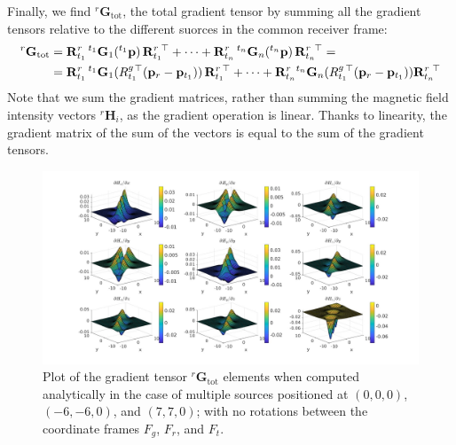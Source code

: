 Finally, we find ${}^r \mathbf{G}_{\text{tot}}$, the total gradient tensor by summing all the gradient tensors
relative to the different suorces in the common receiver frame:
\begin{align}
{}^r \mathbf{G}_{\text{tot}} &= 
\mathbf{R}^r_{t_1}  \, {}^{t_1}\mathbf{G}_1({}^{t_1} \mathbf{p}) \, {\mathbf{R}^r_{t_1}}\mkern-2mu^\top + \dots + \mathbf{R}^r_{t_n}  \, {}^{t_n}\mathbf{G}_n({}^{t_n} \mathbf{p}) \, {\mathbf{R}^r_{t_n}}\mkern-2mu^\top \nonumber = \\
&= 
\mathbf{R}^r_{t_1}  \, {}^{t_1}\mathbf{G}_1({R^g_{t_1}}\mkern-4mu^\top ( \mathbf{p}_r - \mathbf{p}_{t_1})) \, {\mathbf{R}^r_{t_1}}\mkern-3mu^\top + 
\cdots + \mathbf{R}^r_{t_n}   {}^{t_n}\mathbf{G}_n({R^g_{t_1}}\mkern-3mu^\top ( \mathbf{p}_r - \mathbf{p}_{t_1}))  {\mathbf{R}^r_{t_n}}\mkern-3mu^\top
\label{eq:G_tot}
\end{align}
Note that we sum the gradient matrices, rather than summing the 
magnetic field intensity vectors \( {}^r \mathbf{H}_i \), 
as the gradient operation is linear. 
Thanks to linearity, the gradient matrix of the sum of the vectors 
is equal to the sum of the gradient tensors.
 
\begin{figure}
\hspace*{-0.2\textwidth}
\includegraphics[width=1.4\textwidth]{images/gradients_multi_anal.jpg}
\caption{Plot of the gradient tensor ${}^r \mathbf{G}_{\text{tot}}$ elements
when computed analytically in the case of multiple sources positioned at  $(0,0,0)$, $(-6,-6,0)$, and $(7,7,0)$; with no rotations 
between the coordinate frames \( F_g \), \( F_r \), and \( F_t \).}
\label{fig:gradients_multi_anal}
\end{figure}

